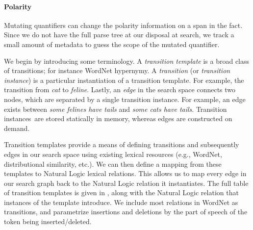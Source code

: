 \paragraph{Polarity}
Mutating quantifiers can change the polarity information on a span
  in the fact.
Since we do not have the full parse tree at our disposal at search,
  we track a small amount of metadata to guess the scope of the
  mutated quantifier.


%
%
We begin by introducing some terminology.
A \textit{transition template} is a broad class of transitions; for
  instance WordNet hypernymy.
A \textit{transition} (or \textit{transition instance}) is a particular
  instantiation of a transition template.
For example, the transition from \textit{cat} to \textit{feline}.
Lastly, an \textit{edge} in the search space connects two nodes, which
  are separated by a single transition instance.
For example, an edge exists between 
  \textit{some felines have tails} and \textit{some cats have tails}.
Transition \lbrack instances\rbrack\ are stored statically in memory, 
  whereas edges are constructed on demand.

Transition templates provide a means of defining transitions and
  subsequently edges in our search space using existing lexical
  resources (e.g., WordNet, distributional similarity, etc.).
We can then define a mapping from these templates to Natural Logic
  lexical relations.
This allows us to map every edge in our search graph back to the
  Natural Logic relation it instantiates.
The full table of transition templates is given in ,
  along with the Natural Logic relation 
  that instances of the template introduce.
We include most relations in WordNet as transitions,
  and parametrize insertions and deletions by the part of speech
  of the token being inserted/deleted.


